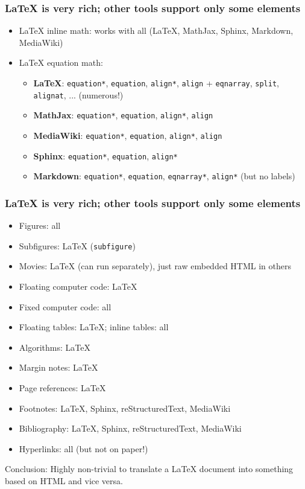 \documentclass{beamer}
\begin{document}
\begin{frame}
\frametitle{{\LaTeX} is very rich; other tools support only some elements}

\begin{itemize}
 \item {\LaTeX} inline math: works with all ({\LaTeX}, MathJax, Sphinx, Markdown, MediaWiki)
 \item {\LaTeX} equation math:
\begin{itemize}
    \item \textbf{LaTeX}: \texttt{equation*}, \texttt{equation}, \texttt{align*}, \texttt{align} + \texttt{eqnarray}, \texttt{split}, \texttt{alignat}, ... (numerous!)
    \item \textbf{MathJax}: \texttt{equation*}, \texttt{equation}, \texttt{align*}, \texttt{align}
    \item \textbf{MediaWiki}: \texttt{equation*}, \texttt{equation}, \texttt{align*}, \texttt{align}
    \item \textbf{Sphinx}: \texttt{equation*}, \texttt{equation}, \texttt{align*}
    \item \textbf{Markdown}: \texttt{equation*}, \texttt{equation}, \texttt{eqnarray*}, \texttt{align*} (but no labels)
\end{itemize}
\noindent
\end{itemize}
\noindent
\end{frame}

\begin{frame}
\frametitle{{\LaTeX} is very rich; other tools support only some elements}

\begin{itemize}
\pause
 \item Figures: all
\pause
 \item Subfigures: {\LaTeX} (\texttt{subfigure})
\pause
 \item Movies: {\LaTeX} (can run separately), just raw embedded HTML in others
\pause
 \item Floating computer code: {\LaTeX}
\pause
 \item Fixed computer code: all
\pause
 \item Floating tables: {\LaTeX}; inline tables: all
\pause
 \item Algorithms: {\LaTeX}
\pause
 \item Margin notes: {\LaTeX}
\pause
 \item Page references: {\LaTeX}
\pause
 \item Footnotes: {\LaTeX}, Sphinx, reStructuredText, MediaWiki
\pause
 \item Bibliography: {\LaTeX}, Sphinx, reStructuredText, MediaWiki
\pause
 \item Hyperlinks: all (but not on paper!)
\end{itemize}
\noindent
\pause
Conclusion: Highly non-trivial to translate a {\LaTeX} document into something
based on HTML and vice versa.
\end{frame}
\end{document}
